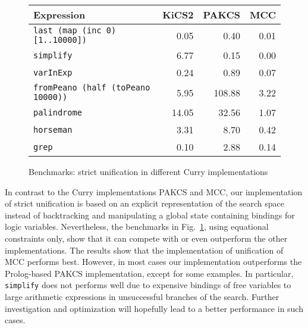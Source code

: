 \documentclass{llncs}
\newcommand{\code}[1]{\mbox{\small\texttt{#1}}}
\begin{document}
\begin{figure}[t]
\centering
\begin{tabular}{|l|r|r|r|}
\hline
Expression                              & KiCS2 & PAKCS  & MCC  \\
\hline
\code{last (map (inc 0) [1..10000])}   & 0.05  & 0.40   &  0.01\\
\code{simplify}                         & 6.77  & 0.15   & 0.00 \\
\code{varInExp}                         & 0.24  & 0.89   & 0.07 \\
\code{fromPeano (half (toPeano 10000))} & 5.95  & 108.88 & 3.22 \\
\code{palindrome}                       & 14.05 & 32.56  & 1.07 \\
\code{horseman}                         & 3.31  & 8.70   & 0.42 \\
\code{grep}                             & 0.10  & 2.88   & 0.14 \\
\hline
\end{tabular}
\caption{Benchmarks: strict unification in different Curry implementations}
 \label{fig:unification}
\end{figure}

In contrast to the Curry implementations PAKCS and MCC,
our implementation of strict unification is based
on an explicit representation of the search space instead of
backtracking and manipulating
a global state containing bindings for logic variables.
Nevertheless, the benchmarks in Fig.~\ref{fig:unification},
using equational constraints only,
show that it can compete with or even outperform the other implementations.
The results show that the implementation of unification
of MCC performs best. However, in most cases our implementation 
outperforms the Prolog-based PAKCS implementation, 
except for some examples. In particular, \code{simplify} does not performs well
due to expensive bindings of free variables to large arithmetic expressions
in unsuccessful branches of the search. Further investigation
and optimization will hopefully lead to a better performance in
such cases.
\end{document}
